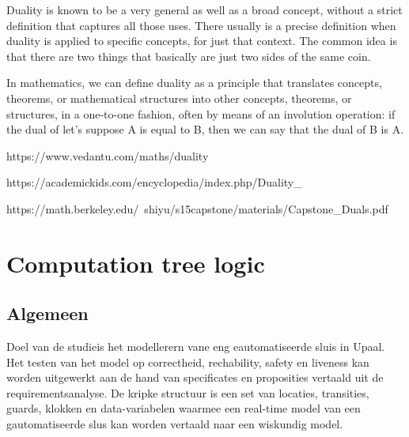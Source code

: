 \documentclass{article}
\begin{document}
	
	Duality is known to be a very general as well as a broad concept, without a strict definition that captures all those uses. There usually is a precise definition when duality is applied to specific concepts, for just that context. The common idea is that there are two things that basically are just two sides of the same coin.
	
	In mathematics, we can define duality as a principle that translates concepts, theorems, or mathematical structures into other concepts, theorems, or structures, in a one-to-one fashion, often by means of an involution operation: if the dual of let’s suppose A is equal to B, then we can say that the dual of B is A.
	
	https://www.vedantu.com/maths/duality
	
	
	https://academickids.com/encyclopedia/index.php/Duality_%
	
	https://math.berkeley.edu/~shiyu/s15capstone/materials/Capstone_Duals.pdf
	\section{Computation tree logic}
	
	\subsection{Algemeen}
	Doel van de studieis het modellerern vane eng eautomatiseerde sluis in Upaal. Het testen van het model op correctheid, rechability, safety en liveness kan worden uitgewerkt aan de hand van specificates en proposities vertaald uit de requirementsanalyse. De kripke structuur is een set van locaties, transities, guards, klokken en data-variabelen waarmee een real-time model van een gautomatiseerde slus kan worden vertaald naar een wiskundig model.
	
\end{document}
